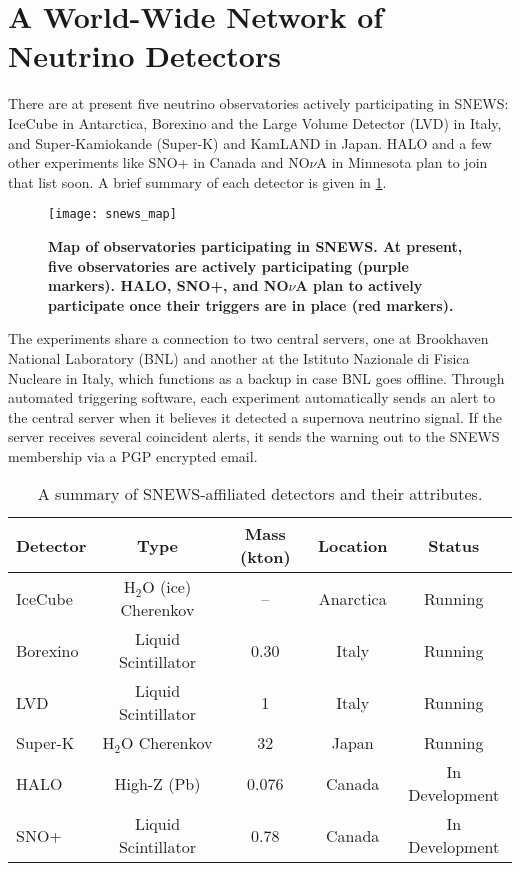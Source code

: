 	\section{A World-Wide Network of Neutrino Detectors}
	There are at present five neutrino observatories actively participating in SNEWS: IceCube in Antarctica, Borexino and the Large Volume Detector (LVD) in Italy, and Super-Kamiokande (Super-K) and KamLAND in Japan. HALO and a few other experiments like SNO+ in Canada and NO$\nu$A in Minnesota plan to join that list soon. A brief summary of each detector is given in \TAB \ref{table:snews_detectors}.
		\begin{figure}[H]
		\centering
		\texttt{[image: snews\_map]}
		\caption[Map of Observatories Participating in SNEWS]{\bf Map of observatories participating in SNEWS. \rm At present, five observatories are actively participating (purple markers). HALO, SNO+, and NO$\nu$A plan to actively participate once their triggers are in place (red markers).}
		\label{fig:snews_map}
	\end{figure}

	The experiments share a connection to two central servers, one at Brookhaven National Laboratory (BNL) and another at the Istituto Nazionale di Fisica Nucleare in Italy, which functions as a backup in case BNL goes offline. Through automated triggering software, each experiment automatically sends an alert to the central server when it believes it detected a supernova neutrino signal. If the server receives several coincident alerts, it sends the warning out to the SNEWS membership via a PGP encrypted email. 

	\begin{table}[H]
		\centering
		\caption[Summary of SNEWS Detectors]{A summary of SNEWS-affiliated detectors and their attributes\cite{Antonioli2004}.}
		\label{table:snews_detectors}
			\begin{tabular}{lcccc}
				\toprule
				Detector & Type & Mass (kton) & Location & Status \\
				\midrule
				IceCube & H$_2$O (ice) Cherenkov & -- & Anarctica & Running \\
				Borexino & Liquid Scintillator & 0.30 & Italy & Running \\
				LVD & Liquid Scintillator & 1 & Italy & Running \\
				Super-K & H$_2$O Cherenkov 	& 32 & Japan & Running \\
				HALO & High-Z (Pb) & 0.076 & Canada & In Development \\
				SNO+ & Liquid Scintillator & 0.78 & Canada & In Development \\
				\bottomrule
			\end{tabular}
	\end{table}


